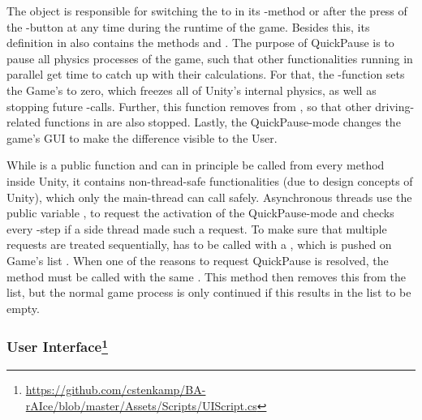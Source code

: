 The object  is responsible for switching the  to  in its -method or after the press of the -button at any time during the runtime of the game. Besides this, its definition in  also contains the methods  and . The purpose of QuickPause is to pause all physics processes of the game, such that other functionalities running in parallel get time to catch up with their calculations. For that, the -function sets the Game's  to zero, which freezes all of Unity's internal physics, as well as stopping future -calls. Further, this function removes  from , so that other driving-related functions in  are also stopped. Lastly, the QuickPause-mode changes the game's GUI to make the difference visible to the User. 

While  is a public function and can in principle be called from every method inside Unity, it contains non-thread-safe functionalities (due to design concepts of Unity), which only the main-thread can call safely. Asynchronous threads use the public variable , to request the activation of the QuickPause-mode and  checks every -step if a side thread made such a request. To make sure that multiple requests are treated sequentially,  has to be called with a , which is pushed on Game's list . When one of the reasons to request QuickPause is resolved, the method  must be called with the same . This method then removes this  from the list, but the normal game process is only continued if this results in the list to be empty. 

\subsubsection{User Interface\footnote{\url{https://github.com/cstenkamp/BA-rAIce/blob/master/Assets/Scripts/UIScript.cs}}}

